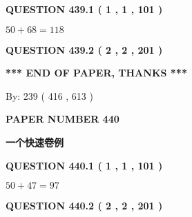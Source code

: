 \documentclass{ctexart}
\begin{document}
   
  
\vspace{0.2in}
  
{\textbf{\Large{QUESTION
439.1 
 ( 1 , 1 , 101 )
}}}
  
  
 
 

$ %
50 +  %
68=   %
118$
 
 
  
\vspace{0.2in}
  
{\textbf{\Large{QUESTION
439.2 
 ( 2 , 2 , 201 )
}}}
  
  
   
   
 \vspace{0.2in}
 
   
   
   
   
\vspace{1.0in} 
{\textbf{\large{ *** END OF PAPER, THANKS *** }}} 
   
   
\hspace{1.0in} By: 
 239 ( 416 ,  613 )
   
   
   
   
\newpage 
\setcounter{page}{ 
   440001 } 
   
   
   
   
 {\textbf{ \Large{ PAPER NUMBER  440  }}}
   
   
\vspace{0.2in}
   
   
   
   
   
   
 \vspace{0.2in}
{\LARGE {\textbf{ 一个快速卷例}}}
   
   
  
\vspace{0.2in}
  
{\textbf{\Large{QUESTION
440.1 
 ( 1 , 1 , 101 )
}}}
  
  
 
 

$ %
50 +  %
47=   %
97$
 
 
  
\vspace{0.2in}
  
{\textbf{\Large{QUESTION
440.2 
 ( 2 , 2 , 201 )
}}}
  
  
   
\end{document}
